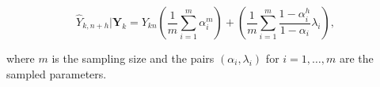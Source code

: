 \begin{equation}
\hat{Y}_{k,n+h} | \bm{Y}_k = Y_{kn}\left(\frac{1}{m} \sum_{i=1}^m\alpha_i^m\right) + \left(\frac{1}{m} \sum_{i=1}^m \frac{1-\alpha_i^h}{1-\alpha_i}\lambda_i\right),
\label{eq:Forecasting Bayesian}
\end{equation}

where $m$ is the sampling size and the pairs $(\alpha_i,\lambda_i)$ for $i=1,\ldots,m$ are the sampled parameters. 